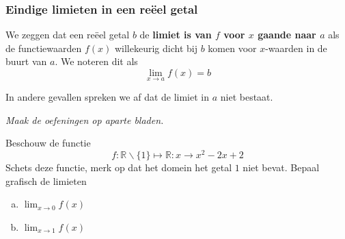 \documentclass[12pt]{article}
\newenvironment{definitie}
{
  \vspace{0.4cm}
  \begin{mdframed}[nobreak=true,frametitle={Definitie}]
  }{%
  \end{mdframed}
}
\begin{document}
\begin{theorie}

\subsubsection*{Eindige limieten in een reëel getal}
\begin{definitie}
  We zeggen dat een reëel getal $b$ de {\bf limiet is van $f$ voor $x$ gaande naar $a$} als de functiewaarden $f(x)$ willekeurig dicht bij $b$ komen voor $x$-waarden in de buurt van $a$. We noteren dit als
  $$\lim_{x\to a} f(x)=b$$
\end{definitie}

In andere gevallen spreken we af dat de limiet in $a$ niet bestaat.

{\em Maak de oefeningen op aparte bladen.}

\end{theorie}

\begin{oefening}
  Beschouw de functie
  $$f:\mathbb{R}\backslash\{1\}\mapsto\mathbb{R}:x\to x^2-2x+2$$
  Schets deze functie, merk op dat het domein het getal $1$ niet bevat. Bepaal grafisch de limieten
  \begin{enumerate}[(a)]
  \itemsep.5em
  \item $\displaystyle\lim_{x\to0} f(x)$
  \item $\displaystyle\lim_{x\to1} f(x)$
  \end{enumerate}
\end{oefening}
\end{document}
